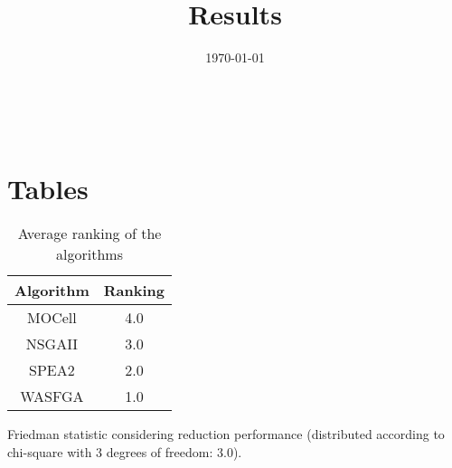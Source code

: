 \documentclass{article}
\title{Results}
\author{}
\date{\today}
\begin{document}
\oddsidemargin 0in \topmargin 0in\maketitle
\
\section{Tables}
\begin{table}[!htp]
\centering
\caption{Average ranking of the algorithms}
\begin{tabular}{c|c}
Algorithm&Ranking\\
\hline
MOCell&4.0\\
NSGAII&3.0\\
SPEA2&2.0\\
WASFGA&1.0\\
\end{tabular}
\end{table}


Friedman statistic considering reduction performance (distributed according to chi-square with 3 degrees of freedom: 3.0).
\end{document}
